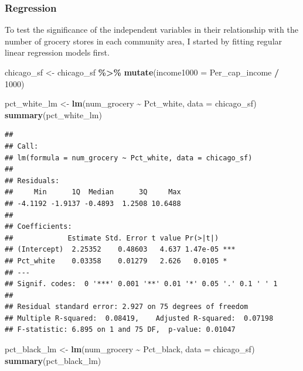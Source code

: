 \documentclass[
]{article}
\newenvironment{Shaded}{\begin{snugshade}}{\end{snugshade}}
\newcommand{\AttributeTok}[1]{\textcolor[rgb]{0.13,0.29,0.53}{#1}}
\newcommand{\DecValTok}[1]{\textcolor[rgb]{0.00,0.00,0.81}{#1}}
\newcommand{\FunctionTok}[1]{\textcolor[rgb]{0.13,0.29,0.53}{\textbf{#1}}}
\newcommand{\NormalTok}[1]{#1}
\newcommand{\OtherTok}[1]{\textcolor[rgb]{0.56,0.35,0.01}{#1}}
\newcommand{\SpecialCharTok}[1]{\textcolor[rgb]{0.81,0.36,0.00}{\textbf{#1}}}
\begin{document}
\hypertarget{regression}{%
\subsubsection{Regression}\label{regression}}

To test the significance of the independent variables in their
relationship with the number of grocery stores in each community area, I
started by fitting regular linear regression models first.

\begin{Shaded}
\begin{Highlighting}[]
\NormalTok{chicago\_sf }\OtherTok{\textless{}{-}}\NormalTok{ chicago\_sf }\SpecialCharTok{\%\textgreater{}\%}
  \FunctionTok{mutate}\NormalTok{(}\AttributeTok{income1000 =}\NormalTok{ Per\_cap\_income }\SpecialCharTok{/} \DecValTok{1000}\NormalTok{)}
\end{Highlighting}
\end{Shaded}

\begin{Shaded}
\begin{Highlighting}[]
\NormalTok{pct\_white\_lm }\OtherTok{\textless{}{-}} \FunctionTok{lm}\NormalTok{(num\_grocery }\SpecialCharTok{\textasciitilde{}}\NormalTok{ Pct\_white, }\AttributeTok{data =}\NormalTok{ chicago\_sf)}
\FunctionTok{summary}\NormalTok{(pct\_white\_lm)}
\end{Highlighting}
\end{Shaded}

\begin{verbatim}
## 
## Call:
## lm(formula = num_grocery ~ Pct_white, data = chicago_sf)
## 
## Residuals:
##     Min      1Q  Median      3Q     Max 
## -4.1192 -1.9137 -0.4893  1.2508 10.6488 
## 
## Coefficients:
##             Estimate Std. Error t value Pr(>|t|)    
## (Intercept)  2.25352    0.48603   4.637 1.47e-05 ***
## Pct_white    0.03358    0.01279   2.626   0.0105 *  
## ---
## Signif. codes:  0 '***' 0.001 '**' 0.01 '*' 0.05 '.' 0.1 ' ' 1
## 
## Residual standard error: 2.927 on 75 degrees of freedom
## Multiple R-squared:  0.08419,    Adjusted R-squared:  0.07198 
## F-statistic: 6.895 on 1 and 75 DF,  p-value: 0.01047
\end{verbatim}

\begin{Shaded}
\begin{Highlighting}[]
\NormalTok{pct\_black\_lm }\OtherTok{\textless{}{-}} \FunctionTok{lm}\NormalTok{(num\_grocery }\SpecialCharTok{\textasciitilde{}}\NormalTok{ Pct\_black, }\AttributeTok{data =}\NormalTok{ chicago\_sf)}
\FunctionTok{summary}\NormalTok{(pct\_black\_lm)}
\end{Highlighting}
\end{Shaded}
\end{document}

